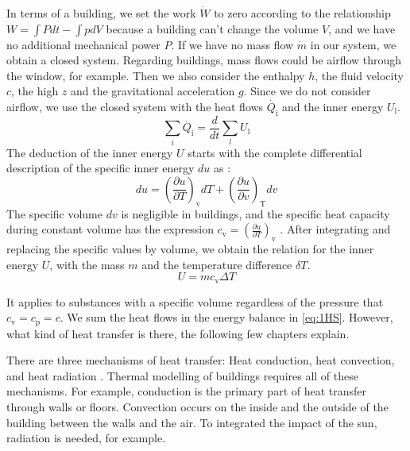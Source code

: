     In terms of a building, we set the work $\dot{W}$ to zero according to the relationship $W =\int Pdt - \int pdV$ \cite{Baehr.2016b} because a building can't change the volume $V$, and we have no additional mechanical power $P$. If we have no mass flow $\dot{m}$ in our system, we obtain a closed system. Regarding buildings, mass flows could be airflow through the window, for example. Then we also consider the enthalpy $h$, the fluid velocity $c$, the high $z$ and the gravitational acceleration $g$.
    \newline
    Since we do not consider airflow, we use the closed system with the heat flows $\dot{Q_\text{i}}$ and the inner energy $U_\text{l}$.
     \begin{equation}
        \label{eq:1HS}
        \sum_i \dot{Q_\text{i}}  = \frac{d}{dt} \sum_l U_\text{l}
    \end{equation}
    The deduction of the inner energy $U$ starts with the complete differential description of the specific inner energy $du$ as \cite{Baehr.2016b}:
    \begin {equation} 
    \label{eq:innerEnergy}
    du = (\frac{\partial u}{\partial T})_\text{v} dT + (\frac{\partial u}{\partial v})_\text{T} dv
    \end{equation}
    The specific volume $dv$ is negligible in buildings, and the specific heat capacity during constant volume has the expression $c_\text{v} = (\frac{\partial u}{\partial T})_\text{v}$ \cite{Baehr.2016b}. After integrating and replacing the specific values by volume, we obtain the relation for the inner energy $U$, with the mass $m$ and the temperature difference $\delta T$. 
        \begin{equation}
        \label{eq:innerEnergy}
        U = m c_\text{v} \Delta T
    \end{equation}
    
    It applies to substances with a specific volume regardless of the pressure that $c_\text{v}=c_\text{p}=c$. 
    We sum the heat flows in the energy balance in \autoref{eq:1HS}. However, what kind of heat transfer is there, the following few chapters explain.
    
    \vspace{2cm}
    
    There are three mechanisms of heat transfer: Heat conduction, heat convection, and heat radiation \cite{.2013}. Thermal modelling of buildings requires all of these mechanisms. For example, conduction is the primary part of heat transfer through walls or floors. Convection occurs on the inside and the outside of the building between the walls and the air. To integrated the impact of the sun, radiation is needed, for example.

